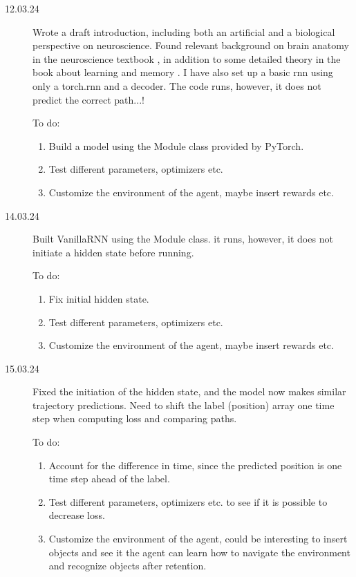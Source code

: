 \begin{description}
    \item[12.03.24] Wrote a draft introduction, including both an artificial and a biological perspective on neuroscience. Found relevant background on brain anatomy in the neuroscience textbook \cite{bear:2016:neuroscience}, in addition to some detailed theory in the book about learning and memory \cite{byrne:2008:learning_memory}. I have also set up a basic rnn using only a torch.rnn and a decoder. The code runs, however, it does not predict the correct path...! 

    To do: %
    \begin{enumerate}
        \item Build a model using the Module class provided by PyTorch.
        \item Test different parameters, optimizers etc.
        \item Customize the environment of the agent, maybe insert rewards etc.
    \end{enumerate}

    \item[14.03.24] Built VanillaRNN using the Module class. it runs, however, it does not initiate a hidden state before running. 

    To do: %
    \begin{enumerate}
        \item Fix initial hidden state.
        \item Test different parameters, optimizers etc.
        \item Customize the environment of the agent, maybe insert rewards etc.
    \end{enumerate}

    \item[15.03.24] Fixed the initiation of the hidden state, and the model now makes similar trajectory predictions. Need to shift the label (position) array one time step when computing loss and comparing paths.

    To do: %
    \begin{enumerate}
        \item Account for the difference in time, since the predicted position is one time step ahead of the label.
        \item Test different parameters, optimizers etc. to see if it is possible to decrease loss. 
        \item Customize the environment of the agent, could be interesting to insert objects and see it the agent can learn how to navigate the environment and recognize objects after retention.
    \end{enumerate}
\end{description}